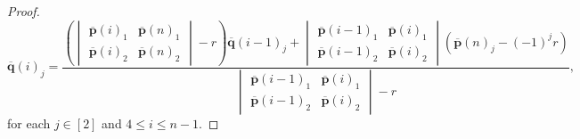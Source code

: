 \documentclass[11pt]{amsart}
\theoremstyle{definition}
\theoremstyle{remark}
\begin{document}
\begin{proof}
\begin{equation}
        \overline{\mathbf{q}}(i)_j = \frac{\left(\begin{vmatrix} \overline{\mathbf{p}}(i)_1 & \overline{\mathbf{p}}(n)_1 \\ \overline{\mathbf{p}}(i)_2 & \overline{\mathbf{p}}(n)_2 \end{vmatrix} - r\right)\overline{\mathbf{q}}(i-1)_j + \begin{vmatrix} \overline{\mathbf{p}}(i-1)_1 & \overline{\mathbf{p}}(i)_1 \\ \overline{\mathbf{p}}(i-1)_2 & \overline{\mathbf{p}}(i)_2 \end{vmatrix}(\overline{\mathbf{p}}(n)_j - (-1)^jr)}{\begin{vmatrix} \overline{\mathbf{p}}(i-1)_1 & \overline{\mathbf{p}}(i)_1 \\ \overline{\mathbf{p}}(i-1)_2 & \overline{\mathbf{p}}(i)_2 \end{vmatrix} - r},
    \end{equation}
    for each $j\in[2]$ and $4\leq i \leq n-1$.


\end{proof}
\end{document}
